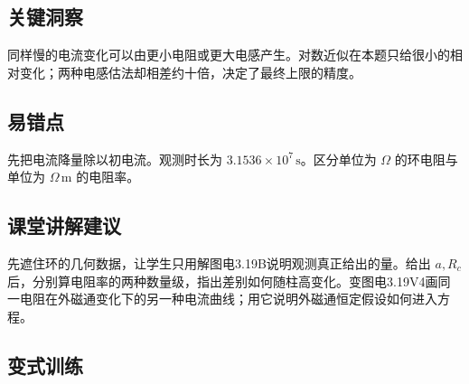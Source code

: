 \documentclass[UTF8,fontset=fandol,a4paper,11pt]{ctexart}
\begin{document}

\subsection*{关键洞察}

同样慢的电流变化可以由更小电阻或更大电感产生。对数近似在本题只给很小的相对变化；两种电感估法却相差约十倍，决定了最终上限的精度。



\subsection*{易错点}

先把电流降量除以初电流。观测时长为 $3.1536\times10^7\,\mathrm s$。区分单位为 $\Omega$ 的环电阻与单位为 $\Omega\,\mathrm m$ 的电阻率。



\subsection*{课堂讲解建议}

先遮住环的几何数据，让学生只用解图电3.19B说明观测真正给出的量。给出 $a,R_c$ 后，分别算电阻率的两种数量级，指出差别如何随柱高变化。变图电3.19V4画同一电阻在外磁通变化下的另一种电流曲线；用它说明外磁通恒定假设如何进入方程。


\subsection*{变式训练}
\end{document}
